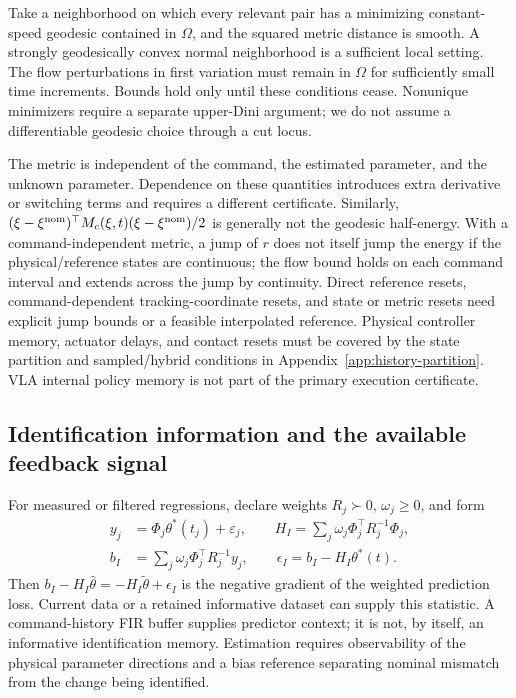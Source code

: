 Take a neighborhood on which every relevant pair has a minimizing
constant-speed geodesic contained in $\Omega$, and the squared metric
distance is smooth. A strongly geodesically convex normal neighborhood
is a sufficient local setting. The flow perturbations in first variation
must remain in $\Omega$ for sufficiently small time increments. Bounds
hold only until these conditions cease. Nonunique minimizers require a
separate upper-Dini argument; we do not assume a differentiable geodesic
choice through a cut locus.

The metric is independent of the command, the estimated parameter, and
the unknown parameter. Dependence on these quantities introduces extra
derivative or switching terms and requires a different certificate.
Similarly, $(\xi-\xi^{\rm nom})^\top M_c(\xi,t)(\xi-\xi^{\rm nom})/2$ is generally not
the geodesic half-energy. With a command-independent metric, a jump of
$r$ does not itself jump the energy if the physical/reference states are
continuous; the flow bound holds on each command interval and extends
across the jump by continuity. Direct reference resets, command-dependent
tracking-coordinate resets, and state or metric resets need explicit
jump bounds or a feasible interpolated reference. Physical controller
memory, actuator delays, and contact resets must be covered by the state
partition and sampled/hybrid conditions in
Appendix~\ref{app:history-partition}. VLA internal policy memory is not
part of the primary execution certificate.

\subsection{Identification information and the available feedback signal}
For measured or filtered regressions, declare weights $R_j\succ0$,
$\omega_j\ge0$, and form
\begin{align}
 y_j&=\Phi_j\theta^*(t_j)+\varepsilon_j,\qquad
 H_I=\sum_j\omega_j\Phi_j^\top R_j^{-1}\Phi_j,\nonumber\\
 b_I&=\sum_j\omega_j\Phi_j^\top R_j^{-1}y_j,\qquad
 \epsilon_I=b_I-H_I\theta^*(t).
 \label{eq:gen-information}
\end{align}
Then $b_I-H_I\hat\theta=-H_I\tilde\theta+\epsilon_I$ is the negative
gradient of the weighted prediction loss. Current data or a retained
informative dataset can supply this statistic. A command-history FIR
buffer supplies predictor context; it is not, by itself, an informative
identification memory. Estimation requires observability of the physical
parameter directions and a bias reference separating nominal mismatch
from the change being identified.

